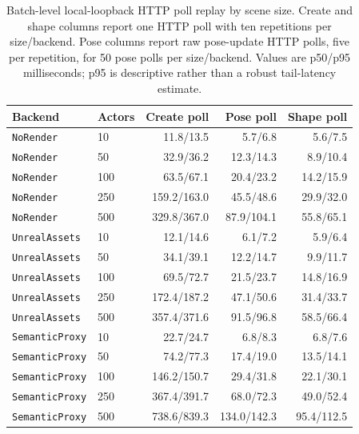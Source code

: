 ﻿\documentclass[11pt,a4paper]{article}
\begin{document}
\begin{table}[H]
\centering
\scriptsize
\setlength{\tabcolsep}{3pt}
\caption{Batch-level local-loopback HTTP poll replay by scene size. Create and
shape columns report one HTTP poll with ten repetitions per size/backend. Pose
columns report raw pose-update HTTP polls, five per repetition, for 50 pose
polls per size/backend. Values are p50/p95 milliseconds; p95 is descriptive
rather than a robust tail-latency estimate.}
\label{tab:http-poll-batch}
\begin{tabular}{@{}llrrr@{}}
\toprule
Backend & Actors & Create poll & Pose poll & Shape poll \\
\midrule
\texttt{NoRender} & 10 & 11.8/13.5 & 5.7/6.8 & 5.6/7.5 \\
\texttt{NoRender} & 50 & 32.9/36.2 & 12.3/14.3 & 8.9/10.4 \\
\texttt{NoRender} & 100 & 63.5/67.1 & 20.4/23.2 & 14.2/15.9 \\
\texttt{NoRender} & 250 & 159.2/163.0 & 45.5/48.6 & 29.9/32.0 \\
\texttt{NoRender} & 500 & 329.8/367.0 & 87.9/104.1 & 55.8/65.1 \\
\texttt{UnrealAssets} & 10 & 12.1/14.6 & 6.1/7.2 & 5.9/6.4 \\
\texttt{UnrealAssets} & 50 & 34.1/39.1 & 12.2/14.7 & 9.9/11.7 \\
\texttt{UnrealAssets} & 100 & 69.5/72.7 & 21.5/23.7 & 14.8/16.9 \\
\texttt{UnrealAssets} & 250 & 172.4/187.2 & 47.1/50.6 & 31.4/33.7 \\
\texttt{UnrealAssets} & 500 & 357.4/371.6 & 91.5/96.8 & 58.5/66.4 \\
\texttt{SemanticProxy} & 10 & 22.7/24.7 & 6.8/8.3 & 6.8/7.6 \\
\texttt{SemanticProxy} & 50 & 74.2/77.3 & 17.4/19.0 & 13.5/14.1 \\
\texttt{SemanticProxy} & 100 & 146.2/150.7 & 29.4/31.8 & 22.1/30.1 \\
\texttt{SemanticProxy} & 250 & 367.4/391.7 & 68.0/72.3 & 49.0/52.4 \\
\texttt{SemanticProxy} & 500 & 738.6/839.3 & 134.0/142.3 & 95.4/112.5 \\
\bottomrule
\end{tabular}
\end{table}
\end{document}
